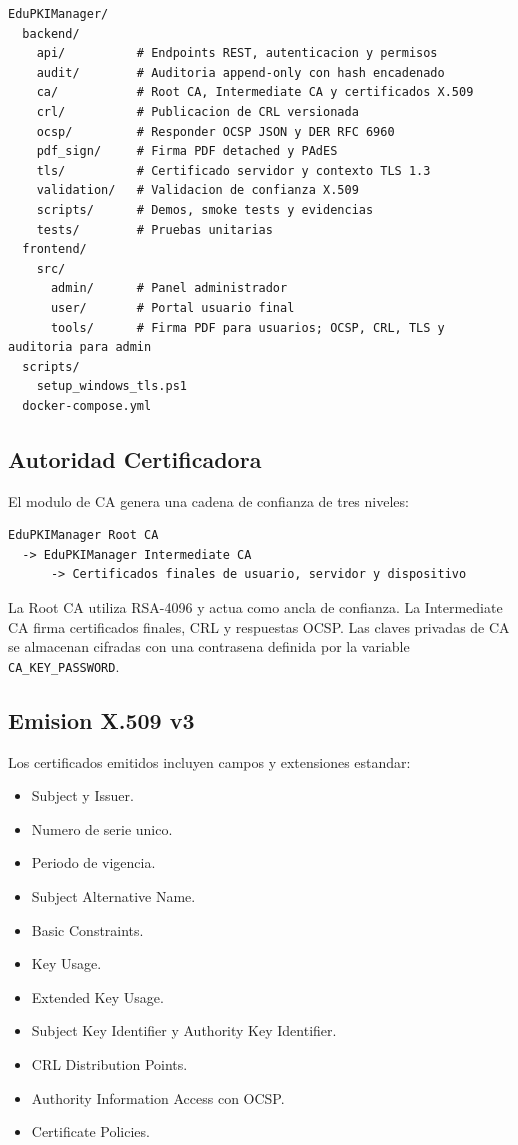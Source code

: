 \documentclass[12pt,a4paper]{article}
\begin{document}
\begin{lstlisting}[style=code]
EduPKIManager/
  backend/
    api/          # Endpoints REST, autenticacion y permisos
    audit/        # Auditoria append-only con hash encadenado
    ca/           # Root CA, Intermediate CA y certificados X.509
    crl/          # Publicacion de CRL versionada
    ocsp/         # Responder OCSP JSON y DER RFC 6960
    pdf_sign/     # Firma PDF detached y PAdES
    tls/          # Certificado servidor y contexto TLS 1.3
    validation/   # Validacion de confianza X.509
    scripts/      # Demos, smoke tests y evidencias
    tests/        # Pruebas unitarias
  frontend/
    src/
      admin/      # Panel administrador
      user/       # Portal usuario final
      tools/      # Firma PDF para usuarios; OCSP, CRL, TLS y auditoria para admin
  scripts/
    setup_windows_tls.ps1
  docker-compose.yml
\end{lstlisting}

\subsection{Autoridad Certificadora}

El modulo de CA genera una cadena de confianza de tres niveles:

\begin{lstlisting}[style=code]
EduPKIManager Root CA
  -> EduPKIManager Intermediate CA
      -> Certificados finales de usuario, servidor y dispositivo
\end{lstlisting}

La Root CA utiliza RSA-4096 y actua como ancla de confianza. La Intermediate CA firma certificados finales, CRL y respuestas OCSP. Las claves privadas de CA se almacenan cifradas con una contrasena definida por la variable \texttt{CA\_KEY\_PASSWORD}.

\subsection{Emision X.509 v3}

Los certificados emitidos incluyen campos y extensiones estandar:

\begin{itemize}[leftmargin=*]
    \item Subject y Issuer.
    \item Numero de serie unico.
    \item Periodo de vigencia.
    \item Subject Alternative Name.
    \item Basic Constraints.
    \item Key Usage.
    \item Extended Key Usage.
    \item Subject Key Identifier y Authority Key Identifier.
    \item CRL Distribution Points.
    \item Authority Information Access con OCSP.
    \item Certificate Policies.
\end{itemize}
\end{document}
